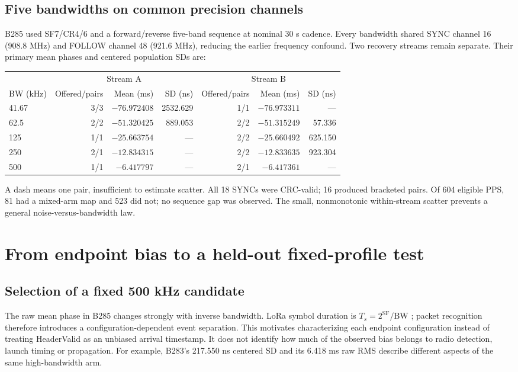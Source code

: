 \documentclass[10pt,letterpaper]{article}
\begin{document}
\subsection{Five bandwidths on common precision channels}
B285 used SF7/CR4/6 and a forward/reverse five-band sequence at nominal 30 s
cadence. Every bandwidth shared SYNC channel 16 (908.8 MHz) and FOLLOW channel
48 (921.6 MHz), reducing the earlier frequency confound. Two recovery streams
remain separate. Their primary mean phases and centered population SDs are:

\begin{center}\small
\begin{tabular}{@{}lrrrrrr@{}}\toprule
&\multicolumn{3}{c}{Stream A}&\multicolumn{3}{c}{Stream B}\\
BW (kHz)&Offered/pairs&Mean (ms)&SD (ns)&Offered/pairs&Mean (ms)&SD (ns)\\\midrule
41.67&3/3&$-76.972408$&2532.629&1/1&$-76.973311$&---\\
62.5&2/2&$-51.320425$&889.053&2/2&$-51.315249$&57.336\\
125&1/1&$-25.663754$&---&2/2&$-25.660492$&625.150\\
250&2/1&$-12.834315$&---&2/2&$-12.833635$&923.304\\
500&1/1&$-6.417797$&---&2/1&$-6.417361$&---\\\bottomrule
\end{tabular}
\end{center}
A dash means one pair, insufficient to estimate scatter. All 18 SYNCs were
CRC-valid; 16 produced bracketed pairs. Of 604 eligible PPS, 81 had a mixed-arm
map and 523 did not; no sequence gap was observed. The small, nonmonotonic
within-stream scatter prevents a general noise-versus-bandwidth law.
\clearpage

\section{From endpoint bias to a held-out fixed-profile test}
\subsection{Selection of a fixed 500 kHz candidate}
The raw mean phase in B285 changes strongly with inverse bandwidth. LoRa
symbol duration is $T_s=2^{\mathrm{SF}}/\mathrm{BW}$ \cite{rinaldi}; packet
recognition therefore introduces a configuration-dependent event separation.
This motivates characterizing each endpoint configuration instead of treating
HeaderValid as an unbiased arrival timestamp. It does not identify how much
of the observed bias belongs to radio detection, launch timing or propagation.
For example, B283's 217.550 ns centered SD and its 6.418 ms raw RMS describe
different aspects of the same high-bandwidth arm.
\end{document}
